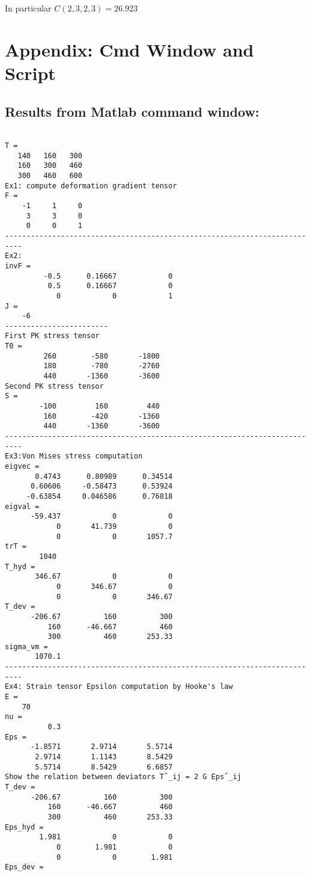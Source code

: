 \documentclass[a4paper,11pt]{article}
\begin{document}
In particular $ C(2,3,2,3)=26.923$
\newpage

 
	 \section{Appendix: Cmd Window and Script}
 
 \subsection{Results from Matlab command window:}
 \begin{verbatim}

T =
   140   160   300
   160   300   460
   300   460   600
Ex1: compute deformation gradient tensor
F =
    -1     1     0
     3     3     0
     0     0     1
--------------------------------------------------------------------------
Ex2:
invF =
         -0.5      0.16667            0
          0.5      0.16667            0
            0            0            1
J =
    -6
------------------------
First PK stress tensor
T0 =
         260        -580       -1800
         180        -780       -2760
         440       -1360       -3600
Second PK stress tensor
S =
        -100         160         440
         160        -420       -1360
         440       -1360       -3600
--------------------------------------------------------------------------
Ex3:Von Mises stress computation
eigvec =
       0.4743      0.80989      0.34514
      0.60606     -0.58473      0.53924
     -0.63854     0.046586      0.76818
eigval =
      -59.437            0            0
            0       41.739            0
            0            0       1057.7
trT =
        1040
T_hyd =
       346.67            0            0
            0       346.67            0
            0            0       346.67
T_dev =
      -206.67          160          300
          160      -46.667          460
          300          460       253.33
sigma_vm =
       1070.1
--------------------------------------------------------------------------
Ex4: Strain tensor Epsilon computation by Hooke's law
E =
    70
nu =
          0.3
Eps =
      -1.8571       2.9714       5.5714
       2.9714       1.1143       8.5429
       5.5714       8.5429       6.6857
Show the relation between deviators Tˆ_ij = 2 G Epsˆ_ij
T_dev =
      -206.67          160          300
          160      -46.667          460
          300          460       253.33
Eps_hyd =
        1.981            0            0
            0        1.981            0
            0            0        1.981
Eps_dev =

\end{verbatim}
\end{document}
